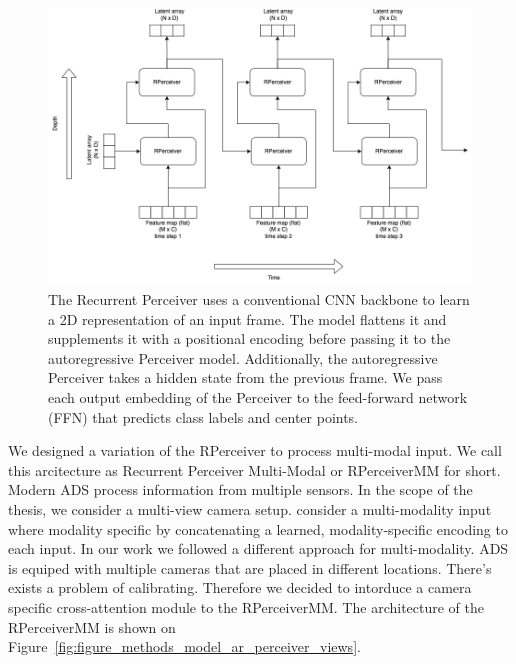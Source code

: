 \begin{figure}
    \centering
    \includegraphics[width=\textwidth]{figures/figure_methods_recurrent_perceiver.png}
    \caption{The Recurrent Perceiver uses a conventional CNN backbone to learn a 2D representation of an input frame. The model flattens it and supplements it with a positional encoding before passing it to the autoregressive Perceiver model. Additionally, the autoregressive Perceiver takes a hidden state from the previous frame. We pass each output embedding of the Perceiver to the feed-forward network (FFN) that predicts class labels and center points.}
    \label{fig:figure_methods_recurrent_perceiver}
\end{figure}

We designed a variation of the RPerceiver to process multi-modal input. We call this arcitecture as Recurrent Perceiver Multi-Modal or RPerceiverMM for short. Modern ADS process information from multiple sensors. In the scope of the thesis, we consider a multi-view camera setup. \cite{jaeglePerceiverGeneralPerception2021} consider a multi-modality input where modality specific by concatenating a learned, modality-specific encoding to each input. In our work we followed a different approach for multi-modality. ADS is equiped with multiple cameras that are placed in different locations. There's exists a problem of calibrating. Therefore we decided to intorduce a camera specific cross-attention module to the RPerceiverMM. The architecture of the RPerceiverMM is shown on Figure~\ref{fig:figure_methods_model_ar_perceiver_views}.


